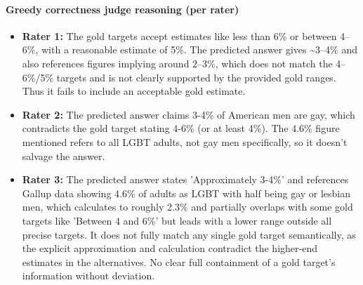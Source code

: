 \documentclass[11pt]{article}
\begin{document}
\paragraph{Greedy correctness judge reasoning (per rater)}
\begin{itemize}
\item \textbf{Rater 1:} The gold targets accept estimates like less than 6\% or between 4–6\%, with a reasonable estimate of 5\%. The predicted answer gives \textasciitilde{}3–4\% and also references figures implying around 2–3\%, which does not match the 4–6\%/5\% targets and is not clearly supported by the provided gold ranges. Thus it fails to include an acceptable gold estimate.
\item \textbf{Rater 2:} The predicted answer claims 3-4\% of American men are gay, which contradicts the gold target stating 4-6\% (or at least 4\%). The 4.6\% figure mentioned refers to all LGBT adults, not gay men specifically, so it doesn't salvage the answer.
\item \textbf{Rater 3:} The predicted answer states 'Approximately 3-4\%' and references Gallup data showing 4.6\% of adults as LGBT with half being gay or lesbian men, which calculates to roughly 2.3\% and partially overlaps with some gold targets like 'Between 4 and 6\%' but leads with a lower range outside all precise targets. It does not fully match any single gold target semantically, as the explicit approximation and calculation contradict the higher-end estimates in the alternatives. No clear full containment of a gold target's information without deviation.
\end{itemize}
\end{document}
